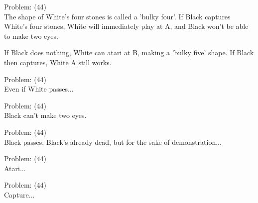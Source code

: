 \documentclass[11pt]{article}
\begin{document}
\begin{minipage}[t]{0.5\textwidth}
  {\centering
  
Problem: (44)\\
The shape of White's four stones is called a 'bulky four'. If Black captures White's four stones, White will immediately play at A, and Black won't be able to make two eyes.

If Black does nothing, White can atari at B, making a 'bulky five' shape. If Black then captures, White A still works.\\
  }
\end{minipage}
\begin{minipage}[t]{0.5\textwidth}
  {\centering
  
Problem: (44)\\
Even if White passes...\\
  }
\end{minipage}
\begin{minipage}[t]{0.5\textwidth}
  {\centering
  
Problem: (44)\\
Black can't make two eyes.\\
  }
\end{minipage}
\begin{minipage}[t]{0.5\textwidth}
  {\centering
  
Problem: (44)\\
Black passes. Black's already dead, but for the sake of demonstration...\\
  }
\end{minipage}
\begin{minipage}[t]{0.5\textwidth}
  {\centering
  
Problem: (44)\\
Atari...\\
  }
\end{minipage}
\begin{minipage}[t]{0.5\textwidth}
  {\centering
  
Problem: (44)\\
Capture...\\
  }
\end{minipage}
\end{document}
